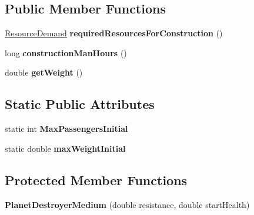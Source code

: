 \subsection*{Public Member Functions}
\begin{DoxyCompactItemize}
\item 
\hyperlink{classuniverse_1_1_resource_demand}{Resource\+Demand} {\bfseries required\+Resources\+For\+Construction} ()\hypertarget{classtools_1_1vehicles_1_1space_1_1_planet_destroyer_medium_a0f782e1edf85435ff37a49acc443ae56}{}\label{classtools_1_1vehicles_1_1space_1_1_planet_destroyer_medium_a0f782e1edf85435ff37a49acc443ae56}

\item 
long {\bfseries construction\+Man\+Hours} ()\hypertarget{classtools_1_1vehicles_1_1space_1_1_planet_destroyer_medium_a4bd5822aa64e49c96a9ddb8f88c0928e}{}\label{classtools_1_1vehicles_1_1space_1_1_planet_destroyer_medium_a4bd5822aa64e49c96a9ddb8f88c0928e}

\item 
double {\bfseries get\+Weight} ()\hypertarget{classtools_1_1vehicles_1_1space_1_1_planet_destroyer_medium_ac73575fc6e6019b92747fb0d59b8ac39}{}\label{classtools_1_1vehicles_1_1space_1_1_planet_destroyer_medium_ac73575fc6e6019b92747fb0d59b8ac39}

\end{DoxyCompactItemize}
\subsection*{Static Public Attributes}
\begin{DoxyCompactItemize}
\item 
static int {\bfseries Max\+Passengers\+Initial}\hypertarget{classtools_1_1vehicles_1_1space_1_1_planet_destroyer_medium_ad603b32ae87da2ffd64fa7234c952adf}{}\label{classtools_1_1vehicles_1_1space_1_1_planet_destroyer_medium_ad603b32ae87da2ffd64fa7234c952adf}

\item 
static double {\bfseries max\+Weight\+Initial}\hypertarget{classtools_1_1vehicles_1_1space_1_1_planet_destroyer_medium_a8f323f15da77c80f68271efeecf4a790}{}\label{classtools_1_1vehicles_1_1space_1_1_planet_destroyer_medium_a8f323f15da77c80f68271efeecf4a790}

\end{DoxyCompactItemize}
\subsection*{Protected Member Functions}
\begin{DoxyCompactItemize}
\item 
{\bfseries Planet\+Destroyer\+Medium} (double resistance, double start\+Health)\hypertarget{classtools_1_1vehicles_1_1space_1_1_planet_destroyer_medium_acacfa8062ec6d4594ee86ca0d056ab5a}{}\label{classtools_1_1vehicles_1_1space_1_1_planet_destroyer_medium_acacfa8062ec6d4594ee86ca0d056ab5a}

\end{DoxyCompactItemize}
